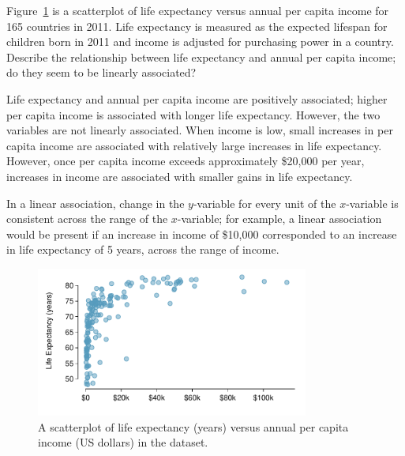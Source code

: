 \begin{examplewrap}
\begin{nexample}{Figure~\ref{incomeLifeExpectancy} is a scatterplot of life expectancy versus annual per capita income for 165 countries in 2011. Life expectancy is measured as the expected lifespan for children born in 2011 and income is adjusted for purchasing power in a country. Describe the relationship between life expectancy and annual per capita income; do they seem to be linearly associated?}

Life expectancy and annual per capita income are positively associated; higher per capita income is associated with longer life expectancy. However, the two variables are not linearly associated. When income is low, small increases in per capita income are associated with relatively large increases in life expectancy. However, once per capita income exceeds approximately \$20,000 per year, increases in income are associated with smaller gains in life expectancy. 

In a linear association, change in the $y$-variable for every unit of the $x$-variable is consistent across the range of the $x$-variable; for example, a linear association would be present if an increase in income of \$10,000 corresponded to an increase in life expectancy of 5 years, across the range of income.
\end{nexample}
\end{examplewrap}

\begin{figure}[h]
	\centering
	\includegraphics[width=0.8\textwidth]
	{ch_01a_intro_to_data_oi_biostat/figures/wdiIncomeLifeExpectancy/wdiIncomeLifeExpectancy.pdf}
	\caption{A scatterplot of life expectancy (years) versus annual per capita income (US dollars) in the  dataset.}
	\label{incomeLifeExpectancy}
\end{figure}


